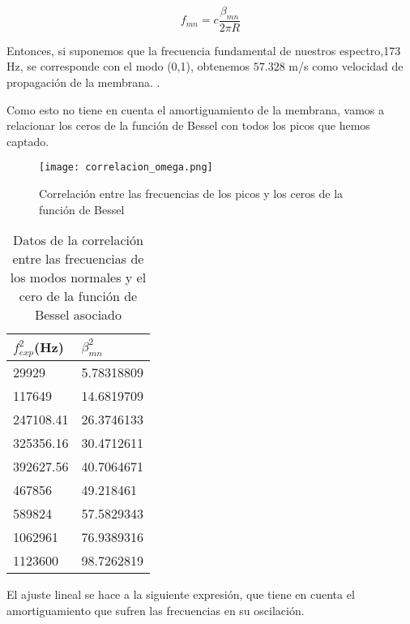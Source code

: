 \documentclass[journal, a4paper,onecolumn]{IEEEtran}
\begin{document}
\begin{equation}
    f_{mn}= c\frac{\beta _{mn}}{2\pi R}
\end{equation}\newline

Entonces, si suponemos que la frecuencia fundamental de nuestros espectro,173 Hz, se corresponde con el modo (0,1), obtenemos $57.328$ m/s como velocidad de propagación de la membrana.
\newline.

Como esto no tiene en cuenta el amortiguamiento de la membrana, vamos a relacionar los ceros de la función de Bessel con todos los picos que hemos captado.\newline

\begin{figure}[H]
    \centering
    \texttt{[image: correlacion\_omega.png]}
    \caption{Correlación entre las frecuencias de los picos y los ceros de la función de Bessel}
   
\end{figure}

\begin{table}[H]
\centering
\begin{tabular}{l|l}
$f_{exp}^2$(Hz) & $\beta_{mn}^2$ \\ \hline
29929     & 5.78318809 \\ \hline
117649    & 14.6819709 \\ \hline
247108.41 & 26.3746133 \\ \hline
325356.16 & 30.4712611 \\ \hline
392627.56 & 40.7064671 \\ \hline
467856    & 49.218461  \\ \hline
589824    & 57.5829343 \\ \hline
1062961   & 76.9389316 \\ \hline
1123600   & 98.7262819


\end{tabular}
\caption{Datos de la correlación entre las frecuencias de los modos normales y el cero de la función de Bessel asociado}
\end{table} 

El ajuste lineal se hace a la siguiente expresión, que tiene en cuenta el amortiguamiento que sufren las frecuencias en su oscilación.\newline
\end{document}
